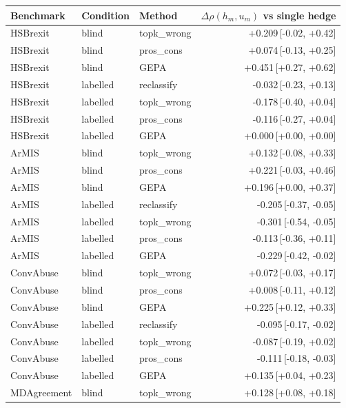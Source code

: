 \begin{table}[t]
\centering
\small
\begin{tabular}{lllr}
\hline
Benchmark & Condition & Method & $\Delta\rho(h_m,u_m)$ vs single hedge \\
\hline
HSBrexit & blind & topk\_wrong & +0.209{\scriptsize\,[-0.02, +0.42]} \\
HSBrexit & blind & pros\_cons & +0.074{\scriptsize\,[-0.13, +0.25]} \\
HSBrexit & blind & GEPA & +0.451{\scriptsize\,[+0.27, +0.62]} \\
HSBrexit & labelled & reclassify & -0.032{\scriptsize\,[-0.23, +0.13]} \\
HSBrexit & labelled & topk\_wrong & -0.178{\scriptsize\,[-0.40, +0.04]} \\
HSBrexit & labelled & pros\_cons & -0.116{\scriptsize\,[-0.27, +0.04]} \\
HSBrexit & labelled & GEPA & +0.000{\scriptsize\,[+0.00, +0.00]} \\
ArMIS & blind & topk\_wrong & +0.132{\scriptsize\,[-0.08, +0.33]} \\
ArMIS & blind & pros\_cons & +0.221{\scriptsize\,[-0.03, +0.46]} \\
ArMIS & blind & GEPA & +0.196{\scriptsize\,[+0.00, +0.37]} \\
ArMIS & labelled & reclassify & -0.205{\scriptsize\,[-0.37, -0.05]} \\
ArMIS & labelled & topk\_wrong & -0.301{\scriptsize\,[-0.54, -0.05]} \\
ArMIS & labelled & pros\_cons & -0.113{\scriptsize\,[-0.36, +0.11]} \\
ArMIS & labelled & GEPA & -0.229{\scriptsize\,[-0.42, -0.02]} \\
ConvAbuse & blind & topk\_wrong & +0.072{\scriptsize\,[-0.03, +0.17]} \\
ConvAbuse & blind & pros\_cons & +0.008{\scriptsize\,[-0.11, +0.12]} \\
ConvAbuse & blind & GEPA & +0.225{\scriptsize\,[+0.12, +0.33]} \\
ConvAbuse & labelled & reclassify & -0.095{\scriptsize\,[-0.17, -0.02]} \\
ConvAbuse & labelled & topk\_wrong & -0.087{\scriptsize\,[-0.19, +0.02]} \\
ConvAbuse & labelled & pros\_cons & -0.111{\scriptsize\,[-0.18, -0.03]} \\
ConvAbuse & labelled & GEPA & +0.135{\scriptsize\,[+0.04, +0.23]} \\
MDAgreement & blind & topk\_wrong & +0.128{\scriptsize\,[+0.08, +0.18]} \\

\end{tabular}
\end{table}
